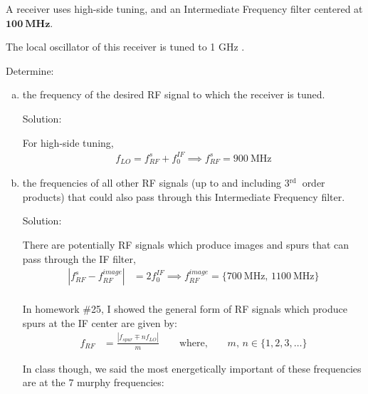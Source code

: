 \begin{homeworkProblem}
    A receiver uses high-side tuning, and an Intermediate Frequency filter centered at $\mathbf{1 0 0 ~ M H z}$.

    The local oscillator of this receiver is tuned to 1 GHz .

    Determine:
    \begin{enumerate}[a)]
        \item the frequency of the desired RF signal to which the receiver is tuned.
            \begin{callout}{Solution:}

            For high-side tuning, 
            \begin{align*}
                f_{LO}=f_{RF}^{s}+f_{0}^{IF} \implies f_{RF}^{s} = 900\mathrm{~MHz}
            \end{align*}

            \end{callout}
        \item the frequencies of all other RF signals (up to and including $3{ }^{\text {rd }}$ order products) that could also pass through this Intermediate Frequency filter.
            \begin{callout}{Solution:}

            There are potentially RF signals which produce images and spurs that can pass through the IF filter,
            \begin{align*}
                |f_{RF}^{s}-f_{RF}^{image}|&=2f_{0}^{IF} \implies f_{RF}^{image} = \{ 700~\mathrm{MHz},\,\mathrm{1100~MHz} \} \\
            \end{align*}

            In homework \#25, I showed the general form of RF signals which produce spurs at the IF center are given by:
            \begin{align}
                \label{eq:general}
                f_{RF} &=  \frac{|f_{spur} \mp nf_{LO}|}{m} \qquad \text{where,} \qquad m,\,n \in \{ 1, 2, 3, \dots \}
            \end{align}

            In class though, we said the most energetically important of these frequencies are at the 7 murphy frequencies:


\end{callout}
\end{enumerate}
\end{homeworkProblem}
